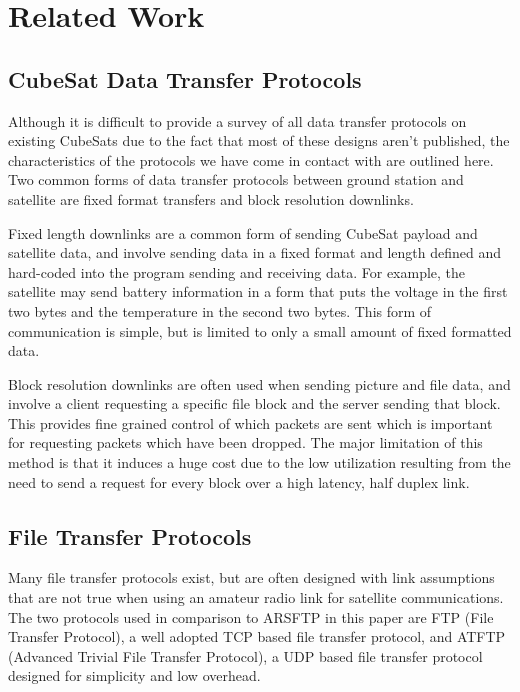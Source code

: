 \documentclass[journal]{./IEEEtran}
\begin{document}
\section{Related Work}

\subsection{CubeSat Data Transfer Protocols}

Although it is difficult to provide a survey of all data transfer protocols on existing CubeSats due to the fact that most of these designs aren’t published, the characteristics of the protocols we have come in contact with are outlined here.  Two common forms of data transfer protocols between ground station and satellite are fixed format transfers and block resolution downlinks.

Fixed length downlinks are a common form of sending CubeSat payload and satellite data, and involve sending data in a fixed format and length defined and hard-coded into the program sending and receiving data.  For example, the satellite may send battery information in a form that puts the voltage in the first two bytes and the temperature in the second two bytes.  This form of communication is simple, but is limited to only a small amount of fixed formatted data.

Block resolution downlinks are often used when sending picture and file data, and involve a client requesting a specific file block and the server sending that block.  This provides fine grained control of which packets are sent which is important for requesting packets which have been dropped.  The major limitation of this method is that it induces a huge cost due to the low utilization resulting from the need to send a request for every block over a high latency, half duplex link.

\subsection{File Transfer Protocols}

Many file transfer protocols exist, but are often designed with link assumptions that are not true when using an amateur radio link for satellite communications.  The two protocols used in comparison to ARSFTP in this paper are FTP (File Transfer Protocol), a well adopted TCP based file transfer protocol, and ATFTP (Advanced Trivial File Transfer Protocol), a UDP based file transfer protocol designed for simplicity and low overhead.
\end{document}
